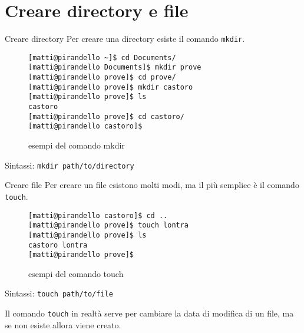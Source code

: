 \section{Creare directory e file}
\begin{frame}[fragile]{Creare directory}
  Per creare una directory esiste il comando \texttt{mkdir}.
  \begin{figure}
    \begin{lstlisting}[basicstyle=\small]
[matti@pirandello ~]$ cd Documents/
[matti@pirandello Documents]$ mkdir prove
[matti@pirandello prove]$ cd prove/
[matti@pirandello prove]$ mkdir castoro 
[matti@pirandello prove]$ ls 
castoro
[matti@pirandello prove]$ cd castoro/
[matti@pirandello castoro]$
    \end{lstlisting}
    \caption{esempi del comando mkdir}
  \end{figure}

  Sintassi: \texttt{mkdir path/to/directory}
\end{frame}

\begin{frame}[fragile]{Creare file}
  Per creare un file esistono molti modi, ma il più semplice è il comando 
  \texttt{touch}.
  \begin{figure}
    \begin{lstlisting}[basicstyle=\small]
[matti@pirandello castoro]$ cd ..
[matti@pirandello prove]$ touch lontra 
[matti@pirandello prove]$ ls 
castoro lontra
[matti@pirandello prove]$
    \end{lstlisting}
    \caption{esempi del comando touch}
  \end{figure}

  Sintassi: \texttt{touch path/to/file} \bigskip

  \footnotesize
  Il comando \texttt{touch} in realtà serve per cambiare la data di modifica di 
  un file, ma se non esiste allora viene creato.\bigskip
\end{frame}

